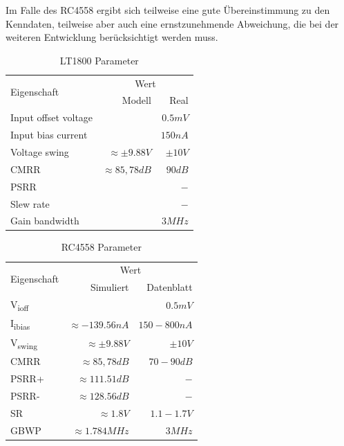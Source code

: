 \documentclass[
	ngerman,
	parskip=half,
	headsepline,
	fontsize=12pt,
	DIV=13,
	listof=leveldown,
	]{scrreprt}
\begin{document}
		Im Falle des RC4558 ergibt sich teilweise eine gute Übereinstimmung zu den Kenndaten, teilweise aber auch eine ernstzunehmende Abweichung, die bei der weiteren Entwicklung berücksichtigt werden muss.
		
		\begin{table}[!h]
			\begin{tabular}{l r r}
				\toprule
				\multirow{2}{*}{Eigenschaft} &
				\multicolumn{2}{c}{Wert} \\
				& Modell & Real \\
				\midrule
				
				Input offset voltage & & $0.5mV$ \\			
				Input bias current & & $150nA$ \\			
				Voltage swing & $ \approx\pm9.88V$ & $ \pm 10V$ \\
				CMRR & $\approx85,78dB$ & $90dB$\\
				PSRR & & $-$ \\
				Slew rate & & $-$\\
				Gain bandwidth & & $3MHz$\\
				\bottomrule
			\end{tabular}
			\caption{LT1800 Parameter}
			\label{fig:opamp-LT1800}
		\end{table}
		\begin{table}[!h]
			\begin{tabular}{l r r}
				\toprule
				\multirow{2}{*}{Eigenschaft} &
					\multicolumn{2}{c}{Wert} \\
					& Simuliert & Datenblatt \\
				\midrule
				
				V\textsubscript{ioff} & & $0.5mV$ \\			
				I\textsubscript{ibias} & $ \approx-139.56nA$ & $150 - 800nA$ \\			
				V\textsubscript{swing} & $ \approx\pm9.88V$ & $ \pm 10V$ \\
				CMRR & $\approx85,78dB$ & $70 - 90dB$\\
				PSRR+ & $\approx 111.51dB$ & $-$ \\
				PSRR- & $\approx 128.56dB$ & $-$ \\
				SR & $ \approx 1.8V$ & $1.1 - 1.7V$\\
				GBWP & $\approx 1.784MHz$ & $3MHz$\\
				\bottomrule
			\end{tabular}
			\caption{RC4558 Parameter}
			\label{fig:opamp-RC4558}
		\end{table}
\end{document}
